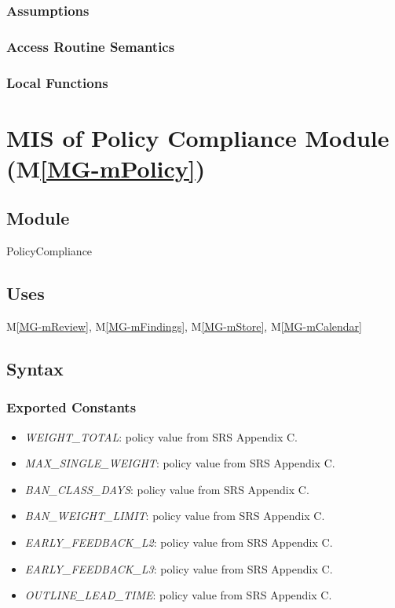\documentclass[12pt, titlepage]{article}
\newcommand{\mref}[1]{M\ref{MG-#1}}
\begin{document}
\subsubsection{Assumptions}

\subsubsection{Access Routine Semantics}

\subsubsection{Local Functions}

\newpage

\section{MIS of Policy Compliance Module (\mref{mPolicy})} \label{mis-mPolicy}

\subsection{Module}
PolicyCompliance

\subsection{Uses}
\mref{mReview}, \mref{mFindings}, \mref{mStore}, \mref{mCalendar}

\subsection{Syntax}

\subsubsection{Exported Constants}
\begin{itemize}
\item \textit{WEIGHT\_TOTAL}: policy value from SRS Appendix C.
\item \textit{MAX\_SINGLE\_WEIGHT}: policy value from SRS Appendix C.
\item \textit{BAN\_CLASS\_DAYS}: policy value from SRS Appendix C.
\item \textit{BAN\_WEIGHT\_LIMIT}: policy value from SRS Appendix C.
\item \textit{EARLY\_FEEDBACK\_L2}: policy value from SRS Appendix C.
\item \textit{EARLY\_FEEDBACK\_L3}: policy value from SRS Appendix C.
\item \textit{OUTLINE\_LEAD\_TIME}: policy value from SRS Appendix C.
\end{itemize}
\end{document}
